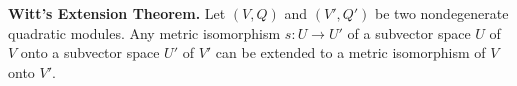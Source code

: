\textbf{Witt's Extension Theorem.} Let $(V,Q)$ and $(V',Q')$ be two nondegenerate quadratic modules. Any metric isomorphism $s: U \to U'$ of a subvector space $U$ of $V$ onto a subvector space $U'$ of $V'$ can be extended to a metric isomorphism of $V$ onto $V'$.
